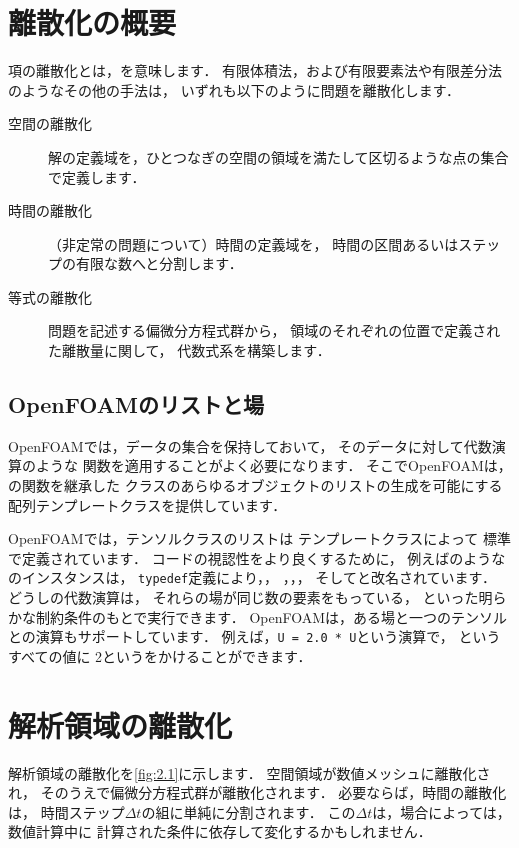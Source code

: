 \section{離散化の概要}
\label{sec:2.2}
項の離散化とは，を意味します．
有限体積法，および有限要素法や有限差分法のようなその他の手法は，
いずれも以下のように問題を離散化します．
\begin{description}
 \item[空間の離散化] 解の定義域を，ひとつなぎの空間の領域を満たして区切るような点の集合で定義します．
 \item[時間の離散化] （非定常の問題について）時間の定義域を，
            時間の区間あるいはステップの有限な数へと分割します．
 \item[等式の離散化] 問題を記述する偏微分方程式群から，
            領域のそれぞれの位置で定義された離散量に関して，
            代数式系を構築します．
\end{description}


\subsection{OpenFOAMのリストと場}
\label{ssec:2.2.1}
OpenFOAMでは，データの集合を保持しておいて，
そのデータに対して代数演算のような
関数を適用することがよく必要になります．
そこでOpenFOAMは，の関数を継承した
クラスのあらゆるオブジェクトのリストの生成を可能にする
配列テンプレートクラスを提供しています．

OpenFOAMでは，テンソルクラスのリストは
テンプレートクラスによって
標準で定義されています．
コードの視認性をより良くするために，
例えばのようなのインスタンスは，
\texttt{typedef}定義により，，
，，，
そしてと改名されています．
どうしの代数演算は，
それらの場が同じ数の要素をもっている，
といった明らかな制約条件のもとで実行できます．
OpenFOAMは，ある場と一つのテンソルとの演算もサポートしています．
例えば，\verb|U = 2.0 * U|という演算で，
というすべての値に
2というをかけることができます．



\section{解析領域の離散化}
\label{sec:2.3}
解析領域の離散化を\autoref{fig:2.1}に示します．
空間領域が数値メッシュに離散化され，
そのうえで偏微分方程式群が離散化されます．
必要ならば，時間の離散化は，
時間ステップ$\Delta{t}$の組に単純に分割されます．
この$\Delta{t}$は，場合によっては，数値計算中に
計算された条件に依存して変化するかもしれません．

